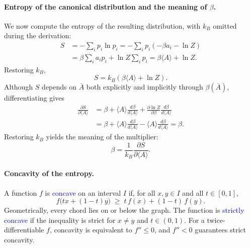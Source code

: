 \paragraph{Entropy of the canonical distribution and the meaning of $\beta$.}
We now compute the entropy of the resulting distribution, with $k_B$
omitted during the derivation:
\begin{align*}
    S &= -\sum_i p_i\ln p_i
    = -\sum_i p_i\left(-\beta a_i-\ln Z\right) \\
    &= \beta\sum_i a_i p_i+\ln Z\sum_i p_i
    = \beta\langle A\rangle+\ln Z.
\end{align*}
Restoring $k_B$,
\begin{equation}
    \boxed{S=k_B\left(\beta\langle A\rangle+\ln Z\right).}
\end{equation}
Although $S$ depends on $\bar A$ both explicitly and implicitly through
$\beta(\bar A)$, differentiating gives
\begin{align*}
    \frac{\partial S}{\partial\langle A\rangle}
    &= \beta
    +\langle A\rangle\frac{d\beta}{d\langle A\rangle}
    +\frac{\partial\ln Z}{\partial\beta}\frac{d\beta}{d\langle A\rangle} \\
    &= \beta
    +\langle A\rangle\frac{d\beta}{d\langle A\rangle}
    -\langle A\rangle\frac{d\beta}{d\langle A\rangle}
    = \beta.
\end{align*}
Restoring $k_B$ yields the meaning of the multiplier:
\begin{equation}
    \boxed{\beta=\frac{1}{k_B}\frac{\partial S}{\partial\langle A\rangle}.}
\end{equation}

\paragraph{Concavity of the entropy.}
A function $f$ is \textcolor{blue}{concave} on an interval $I$ if, for all
$x,y\in I$ and all $t\in[0,1]$,
\begin{equation}
    \boxed{f\big(tx+(1-t)y\big)\;\geq\;t\,f(x)+(1-t)\,f(y).}
\end{equation}
Geometrically, every chord lies on or below the graph. The function is
\textcolor{blue}{strictly concave} if the inequality is strict for $x\neq y$
and $t\in(0,1)$. For a twice-differentiable $f$, concavity is equivalent to
$f''\leq0$, and $f''<0$ guarantees strict concavity.

